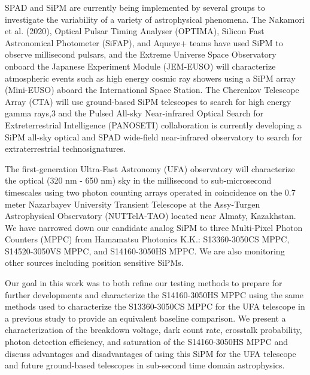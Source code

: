 \documentclass{article}
\begin{document}
SPAD and SiPM are currently being implemented by several groups to investigate the variability of a variety of astrophysical phenomena. The Nakamori et al. (2020),\cite{nakamori2021development} Optical Pulsar Timing Analyser (OPTIMA),\cite{straubmeier2001optima} Silicon Fast Astronomical Photometer (SiFAP),\cite{ambrosino2017optical} and Aqueye+\cite{zampieri2019precise} teams have used SiPM to observe millisecond pulsars, and the Extreme Universe Space Observatory onboard the Japanese Experiment Module (JEM-EUSO) will characterize atmospheric events such as high energy cosmic ray showers using a SiPM array (Mini-EUSO) aboard the International Space Station.\cite{capel2018mini} The Cherenkov Telescope Array (CTA) will use ground-based SiPM telescopes to search for high energy gamma rays,3 and the Pulsed All-sky Near-infrared Optical Search for Extreterrestrial Intelligence (PANOSETI) collaboration is currently developing a SiPM all-sky optical and SPAD wide-field near-infrared observatory to search for extraterrestrial technosignatures.\cite{wright2018panoramic,li2019detector}

The first-generation Ultra-Fast Astronomy (UFA) observatory\cite{li2019program} will characterize the optical (320 nm - 650 nm) sky in the millisecond to sub-microsecond timescales using two photon counting arrays operated in coincidence on the 0.7 meter Nazarbayev University Transient Telescope at the Assy-Turgen Astrophysical Observatory (NUTTelA-TAO) located near Almaty, Kazakhstan. We have narrowed down our candidate analog SiPM to three Multi-Pixel Photon Counters (MPPC) from Hamamatsu Photonics K.K.: S13360-3050CS MPPC, S14520-3050VS MPPC, and S14160-3050HS MPPC. We are also monitoring other sources including position sensitive SiPMs.

Our goal in this work was to both refine our testing methods to prepare for further developments and characterize the S14160-3050HS MPPC using the same methods used to characterize the S13360-3050CS MPPC for the UFA telescope in a previous study\cite{li2019program} to provide an equivalent baseline comparison. We present a characterization of the breakdown voltage, dark count rate, crosstalk probability, photon detection efficiency, and saturation of the S14160-3050HS MPPC and discuss advantages and disadvantages of using this SiPM for the UFA telescope and future ground-based telescopes in sub-second time domain astrophysics.
\end{document}

